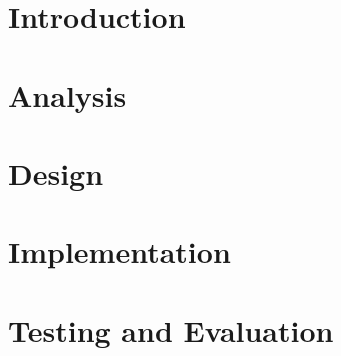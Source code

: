 \documentclass[11pt]{report}
\title{}
\subtitle{}
\begin{document}
    

    \maketitle

    \tableofcontents



    \chapter{Introduction}\label{ch:introduction}

    

    \chapter{Analysis}\label{ch:analysis}

    
    
    

    \chapter{Design}\label{ch:design}

    
    
    

    \chapter{Implementation}\label{ch:implementation}

    
    
    
    
    

    \chapter{Testing and Evaluation}\label{ch:testing-and-evaluation}
\end{document}
